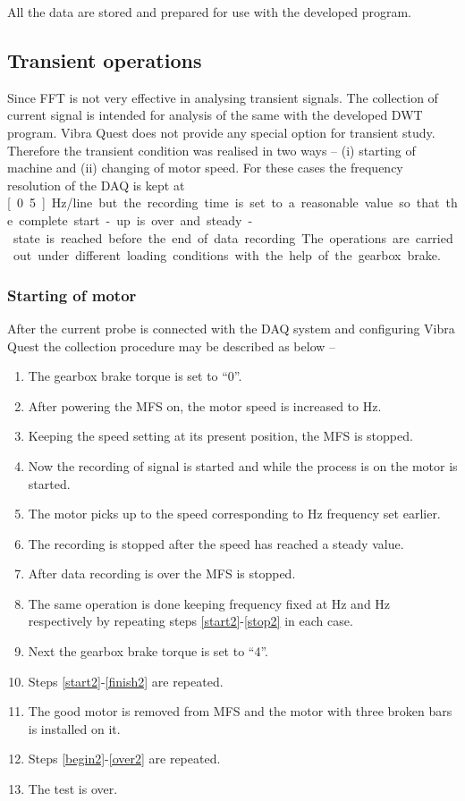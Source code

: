 \documentclass[a4paper,11pt]{report}
\begin{document}
All the data are stored and prepared for use with the developed program.

\subsection{Transient operations}
Since FFT is not very effective in analysing transient signals. The collection of current signal is intended for analysis of the same with the developed DWT program. Vibra Quest does not provide any special option for transient study. Therefore the transient condition was realised in two ways -- (i) starting of machine and (ii) changing of motor speed. For these cases the frequency resolution of the DAQ is kept at \unit[0.5]{Hz/line} but the recording time is set to a reasonable value so that the complete start-up is over and steady-state is reached before the end of data recording. The operations are carried out under different loading conditions with the help of the gearbox brake.

\subsubsection{Starting of motor}
After the current probe is connected with the DAQ system and configuring Vibra Quest the collection procedure may be described as below -- 

\begin{enumerate}
\item The gearbox brake torque is set to ``0''. \label{begin2}
\item After powering the MFS on, the motor speed is increased to \unit[30]{Hz}. \label{start2}
\item Keeping the speed setting at its present position, the MFS is stopped. 
\item Now the recording of signal is started and while the process is on the motor is started.
\item The motor picks up to the speed corresponding to \unit[30]{Hz} frequency set earlier.
\item The recording is stopped after the speed has reached a steady value.
\item After data recording is over the MFS is stopped. \label{stop2}
\item The same operation is done keeping frequency fixed at \unit[40]{Hz} and \unit[50]{Hz} respectively by repeating steps \ref{start2}-\ref{stop2} in each case. \label{finish2}
\item Next the gearbox brake torque is set to ``4''.
\item Steps \ref{start2}-\ref{finish2} are repeated. \label{over2}
\item The good motor is removed from MFS and the motor with three broken bars is installed on it.
\item Steps \ref{begin2}-\ref{over2} are repeated.
\item The test is over.
\end{enumerate}
\end{document}

